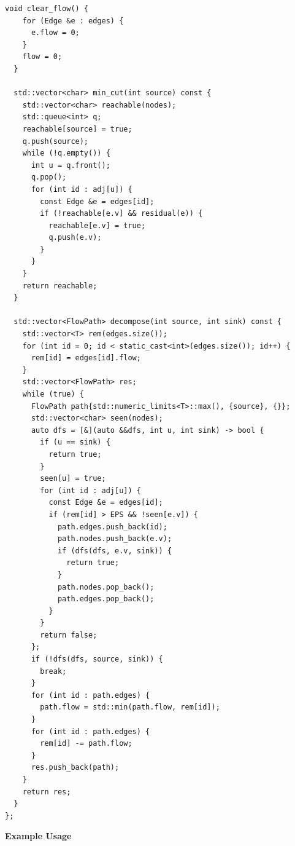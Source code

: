\begin{lstlisting}[style=cpp]
  void clear_flow() {
    for (Edge &e : edges) {
      e.flow = 0;
    }
    flow = 0;
  }

  std::vector<char> min_cut(int source) const {
    std::vector<char> reachable(nodes);
    std::queue<int> q;
    reachable[source] = true;
    q.push(source);
    while (!q.empty()) {
      int u = q.front();
      q.pop();
      for (int id : adj[u]) {
        const Edge &e = edges[id];
        if (!reachable[e.v] && residual(e)) {
          reachable[e.v] = true;
          q.push(e.v);
        }
      }
    }
    return reachable;
  }

  std::vector<FlowPath> decompose(int source, int sink) const {
    std::vector<T> rem(edges.size());
    for (int id = 0; id < static_cast<int>(edges.size()); id++) {
      rem[id] = edges[id].flow;
    }
    std::vector<FlowPath> res;
    while (true) {
      FlowPath path{std::numeric_limits<T>::max(), {source}, {}};
      std::vector<char> seen(nodes);
      auto dfs = [&](auto &&dfs, int u, int sink) -> bool {
        if (u == sink) {
          return true;
        }
        seen[u] = true;
        for (int id : adj[u]) {
          const Edge &e = edges[id];
          if (rem[id] > EPS && !seen[e.v]) {
            path.edges.push_back(id);
            path.nodes.push_back(e.v);
            if (dfs(dfs, e.v, sink)) {
              return true;
            }
            path.nodes.pop_back();
            path.edges.pop_back();
          }
        }
        return false;
      };
      if (!dfs(dfs, source, sink)) {
        break;
      }
      for (int id : path.edges) {
        path.flow = std::min(path.flow, rem[id]);
      }
      for (int id : path.edges) {
        rem[id] -= path.flow;
      }
      res.push_back(path);
    }
    return res;
  }
};
\end{lstlisting}
\textbf{Example Usage}\par
